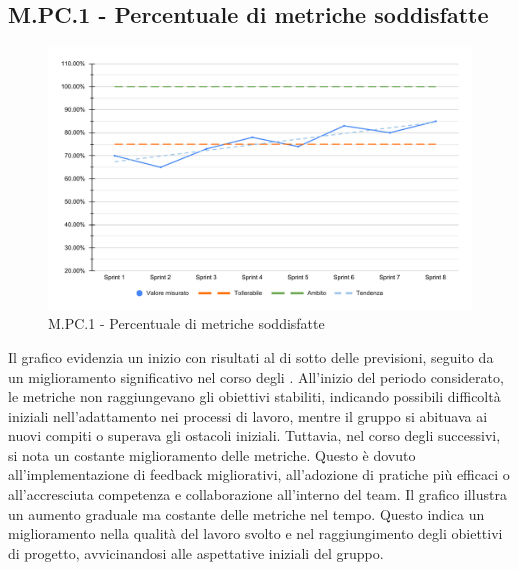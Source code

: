 \subsection{M.PC.1 - Percentuale di metriche soddisfatte}
\begin{figure}[H]
    \centering
    \includegraphics[width=\textwidth]{assets/metriche_soddisfatte.pdf}
    \caption{M.PC.1 - Percentuale di metriche soddisfatte}
\end{figure}

\par Il grafico evidenzia un inizio con risultati al di sotto delle previsioni, seguito da un miglioramento significativo nel corso degli . All'inizio del periodo considerato, le metriche non raggiungevano gli obiettivi stabiliti, indicando possibili difficoltà iniziali nell'adattamento nei processi di lavoro, mentre il gruppo si abituava ai nuovi compiti o superava gli ostacoli iniziali. Tuttavia, nel corso degli  successivi, si nota un costante miglioramento delle metriche. Questo è dovuto all'implementazione di feedback migliorativi, all'adozione di pratiche più efficaci o all'accresciuta competenza e collaborazione all'interno del team.
Il grafico illustra un aumento graduale ma costante delle metriche nel tempo. Questo indica un miglioramento nella qualità del lavoro svolto e nel raggiungimento degli obiettivi di progetto, avvicinandosi alle aspettative iniziali del gruppo.
